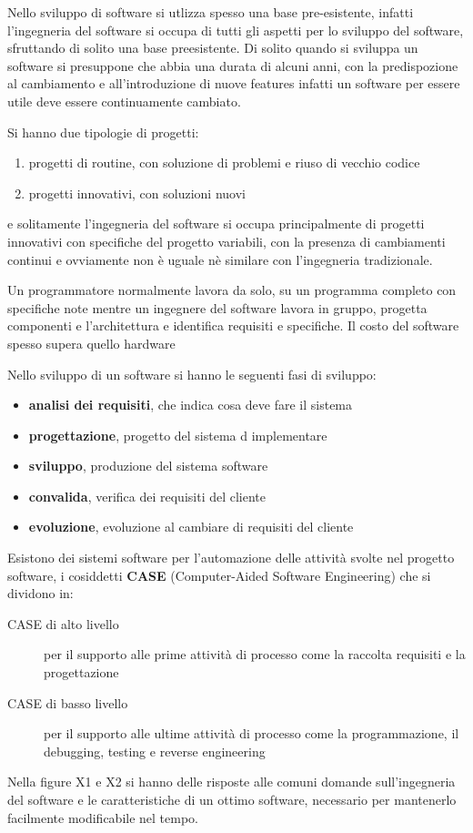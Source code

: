 \documentclass[a4paper,12pt, oneside]{book}
\begin{document}
Nello sviluppo di software si utlizza spesso una base pre-esistente, infatti l'ingegneria del software si occupa
di tutti gli aspetti per lo sviluppo del software, sfruttando di solito una base preesistente. \newline
Di solito quando si sviluppa un software si presuppone che abbia una durata di alcuni anni, con la predispozione
al cambiamento e all'introduzione di nuove features infatti un software per essere utile deve essere continuamente cambiato.

Si hanno due tipologie di progetti:
\begin{enumerate}
    \item progetti di routine, con soluzione di problemi e riuso di vecchio codice
    \item progetti innovativi, con soluzioni nuovi
\end{enumerate}
e solitamente l'ingegneria del software si occupa principalmente di progetti innovativi 
con specifiche del progetto variabili, con la presenza di cambiamenti continui e ovviamente 
non è uguale nè similare con l'ingegneria tradizionale.

Un programmatore normalmente lavora da solo, su un programma completo con specifiche note mentre un ingegnere del software
lavora in gruppo, progetta componenti e l'architettura e identifica requisiti e specifiche.
Il costo del software spesso supera quello hardware %

Nello sviluppo di un software si hanno le seguenti fasi di sviluppo:
\begin{itemize}
    \item \textbf{analisi dei requisiti}, che indica cosa deve fare il sistema
    \item \textbf{progettazione}, progetto del sistema d implementare 
    \item \textbf{sviluppo}, produzione del sistema software
    \item \textbf{convalida}, verifica dei requisiti del cliente
    \item \textbf{evoluzione}, evoluzione al cambiare di requisiti del cliente
\end{itemize} 
Esistono dei sistemi software per l'automazione delle attività svolte nel progetto software, 
i cosiddetti \textbf{CASE} (Computer-Aided Software Engineering) che si dividono in:
\begin{description}
    \item [CASE di alto livello] per il supporto alle prime attività di processo come la raccolta requisiti e la progettazione
    \item [CASE di basso livello] per il supporto alle ultime attività di processo come la programmazione,
                                  il debugging, testing e reverse engineering
\end{description}
Nella figure X1 e X2  si hanno delle risposte alle comuni domande sull'ingegneria del software e le caratteristiche
di un ottimo software, necessario per mantenerlo facilmente modificabile nel tempo.
\end{document}
